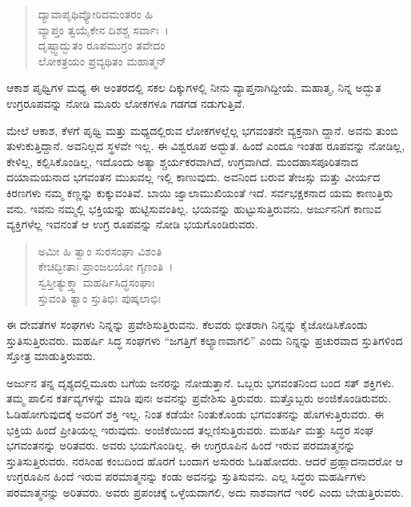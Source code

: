 \begin{verse}
ದ್ಯಾವಾಪೃಥಿವ್ಯೋರಿದಮಂತರಂ ಹಿ \\ ವ್ಯಾಪ್ತಂ ತ್ವಯೈಕೇನ ದಿಶಶ್ಚ ಸರ್ವಾಃ~।\\ದೃಷ್ಟ್ವಾದ್ಭುತಂ ರೂಪಮುಗ್ರಂ ತವೇದಂ \\ ಲೋಕತ್ರಯಂ ಪ್ರವ್ಯಥಿತಂ ಮಹಾತ್ಮನ್ 
\end{verse}

{\small ಆಕಾಶ ಪೃಥ್ವಿಗಳ ಮಧ್ಯ ಈ ಅಂತರದಲ್ಲಿ ಸಕಲ ದಿಕ್ಕುಗಳಲ್ಲಿ ನೀನು ವ್ಯಾಪ್ತನಾಗಿದ್ದೀಯೆ. ಮಹಾತ್ಮ, ನಿನ್ನ ಅದ್ಭುತ ಉಗ್ರರೂಪವನ್ನು ನೋಡಿ ಮೂರು ಲೋಕಗಳೂ ಗಡಗಡ ನಡುಗುತ್ತಿವೆ.}

ಮೇಲೆ ಆಕಾಶ, ಕೆಳಗೆ ಪೃಥ್ವಿ ಮತ್ತು ಮಧ್ಯದಲ್ಲಿರುವ ಲೋಕಗಳಲ್ಲೆಲ್ಲ ಭಗವಂತನೇ ವ್ಯಕ್ತನಾಗಿ ದ್ದಾನೆ. ಅವನು ತುಂಬಿ ತುಳುಕುತ್ತಿದ್ದಾನೆ. ಅವನಿಲ್ಲದ ಸ್ಥಳವೇ ಇಲ್ಲ. ಈ ವಿಶ್ವರೂಪ ಅದ್ಭುತ. ಹಿಂದೆ ಎಂದೂ ಇಂತಹ ರೂಪವನ್ನು ನೋಡಿಲ್ಲ, ಕೇಳಿಲ್ಲ, ಕಲ್ಪಿಸಿಕೊಂಡಿಲ್ಲ, ಇದೊಂದು ಅತ್ಯಾ ಶ್ಚರ್ಯಕರವಾಗಿದೆ, ಉಗ್ರವಾಗಿದೆ. ಮಂದಹಾಸಪೂರಿತನಾದ ದಯಾಮಯನಾದ ಭಗವಂತನ ಮುಖವಲ್ಲ ಇಲ್ಲಿ ಕಾಣುವುದು. ಅವನಿಂದ ಬರುವ ತೇಜಸ್ಸು ಮತ್ತು ವೀರ್ಯದ ಕಿರಣಗಳು ನಮ್ಮ ಕಣ್ಣನ್ನು ಕುಕ್ಕುವಂತಿವೆ. ಬಾಯಿ ಜ್ವಾಲಾಮುಖಿಯಂತೆ ಇದೆ. ಸರ್ವಭಕ್ಷಕನಾದ ಯಮ ಕಾಣುತ್ತಿರು ವನು. ಇವನು ನಮ್ಮಲ್ಲಿ ಭಕ್ತಿಯನ್ನು ಹುಟ್ಟಿಸುವಂತಿಲ್ಲ. ಭಯವನ್ನು ಹುಟ್ಟುಸುತ್ತಿರುವನು. ಅರ್ಜುನನಿಗೆ ಕಾಣುವ ವ್ಯಕ್ತಿಗಳೆಲ್ಲ ಇವನಂತೆ ಆ ಉಗ್ರ ರೂಪವನ್ನು ನೋಡಿ ಭಯಗೊಂಡಿರುವರು.

\begin{verse}
ಅಮೀ ಹಿ ತ್ವಾಂ ಸುರಸಂಘಾ ವಿಶಂತಿ \\ ಕೇಚಿದ್ಭೀತಾಃ ಪ್ರಾಂಜಲಯೋ ಗೃಣಂತಿ~।\\ಸ್ವಸ್ತೀತ್ಯುಕ್ತ್ವಾ ಮಹರ್ಷಿಸಿದ್ಧಸಂಘಾಃ \\ ಸ್ತುವಂತಿ ತ್ವಾಂ ಸ್ತುತಿಭಿಃ ಪುಷ್ಕಲಾಭಿಃ 
\end{verse}

{\small ಈ ದೇವತೆಗಳ ಸಂಘಗಳು ನಿನ್ನನ್ನು ಪ್ರವೇಶಿಸುತ್ತಿರುವನು. ಕೆಲವರು ಭೀತರಾಗಿ ನಿನ್ನನ್ನು ಕೈಜೋಡಿಸಿಕೊಂಡು ಸ್ತುತಿಸುತ್ತಿರುವರು. ಮಹರ್ಷಿ ಸಿದ್ಧ ಸಂಘಗಳು “ಜಗತ್ತಿಗೆ ಕಲ್ಯಾಣವಾಗಲಿ” ಎಂದು ನಿನ್ನನ್ನು ಪ್ರಚುರವಾದ ಸ್ತುತಿಗಳಿಂದ ಸ್ತೋತ್ರ ಮಾಡುತ್ತಿರುವರು.}

ಅರ್ಜುನ ತನ್ನ ದೃಶ್ಯದಲ್ಲಿಮೂರು ಬಗೆಯ ಜನರನ್ನು ನೋಡುತ್ತಾನೆ. ಒಬ್ಬರು ಭಗವಂತನಿಂದ ಬಂದ ಸತ್ ಶಕ್ತಿಗಳು. ತಮ್ಮ ಪಾಲಿನ ಕರ್ತವ್ಯಗಳನ್ನು ಮಾಡಿ ಪುನಃ ಅವನನ್ನು ಪ್ರವೇಶಿಸು ತ್ತಿರುವರು. ಮತ್ತೊಬ್ಬರು ಅಂಜಿಕೊಂಡಿರುವರು. ಓಡಿಹೋಗುವುದಕ್ಕೆ ಅವರಿಗೆ ಶಕ್ತಿ ಇಲ್ಲ. ನಿಂತ ಕಡೆಯೇ ನಿಂತುಕೊಂಡು ಭಗವಂತನನ್ನು ಹೊಗಳುತ್ತಿರುವರು. ಈ ಭಕ್ತಿಯ ಹಿಂದೆ ಪ್ರೀತಿಯಲ್ಲ ಇರುವುದು. ಅಂಜಿಕೆಯಿಂದ ತಲ್ಲಣಿಸುತ್ತಿರುವರು. ಮಹರ್ಷಿ ಮತ್ತು ಸಿದ್ಧರ ಸಂಘ ಭಗವಂತನನ್ನು ಅರಿತವರು. ಅವರು ಭಯಗೊಂಡಿಲ್ಲ. ಈ ಉಗ್ರರೂಪಿನ ಹಿಂದೆ ಇರುವ ಪರಮಾತ್ಮನನ್ನು ಸ್ತುತಿಸುತ್ತಿರುವರು. ನರಸಿಂಹ ಕಂಬದಿಂದ ಹೊರಗೆ ಬಂದಾಗ ಅಸುರರು ಓಡಿಹೋದರು. ಆದರೆ ಪ್ರಹ್ಲಾದನಾದರೋ ಆ ಉಗ್ರರೂಪಿನ ಹಿಂದೆ ಇರುವ ಪರಮಾತ್ಮನನ್ನು ಕಂಡು ಅವನನ್ನು ಸ್ತುತಿಸುವನು. ಎಲ್ಲ ಸಿದ್ಧರು ಮಹರ್ಷಿಗಳು ಪರಮಾತ್ಮನನ್ನು ಅರಿತವರು. ಅವರು ಪ್ರಪಂಚಕ್ಕೆ ಒಳ್ಳೆಯದಾಗಲಿ, ಅದು ನಾಶವಾಗದೆ ಇರಲಿ ಎಂದು ಬೇಡುತ್ತಿರುವರು.

